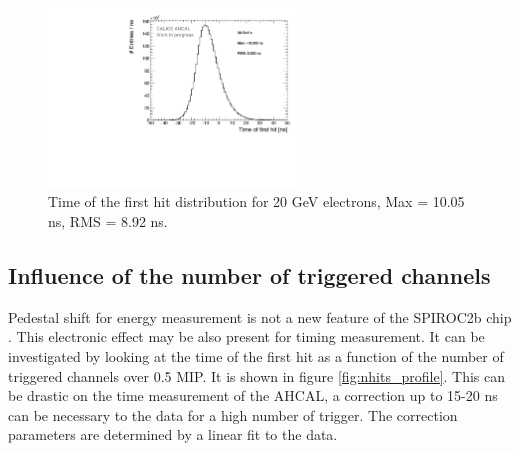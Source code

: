 \begin{figure}[htbp]
\begin{center}
\includegraphics[width=0.6\textwidth]{fig/Electrons/Timing_AllLayers_AfterMuons.pdf}
\caption{Time of the first hit distribution for 20 GeV electrons, Max = 10.05 ns, RMS = 8.92 ns.}
\label{fig:Timing_electrons}
\vspace{-6ex}
\end{center}
\end{figure}

\subsection{Influence of the number of triggered channels}
\label{subsec:ped_shift}

Pedestal shift for energy measurement is not a new feature of the SPIROC2b chip \cite{OskarMaster}. This electronic effect may be also present for timing measurement. It can be investigated by looking at the time of the first hit as a function of the number of triggered channels over 0.5 MIP. It is shown in figure \ref{fig:nhits_profile}. This can be drastic on the time measurement of the AHCAL, a correction up to 15-20 ns can be necessary to the data for a high number of trigger. The correction parameters are determined by a linear fit to the data.

